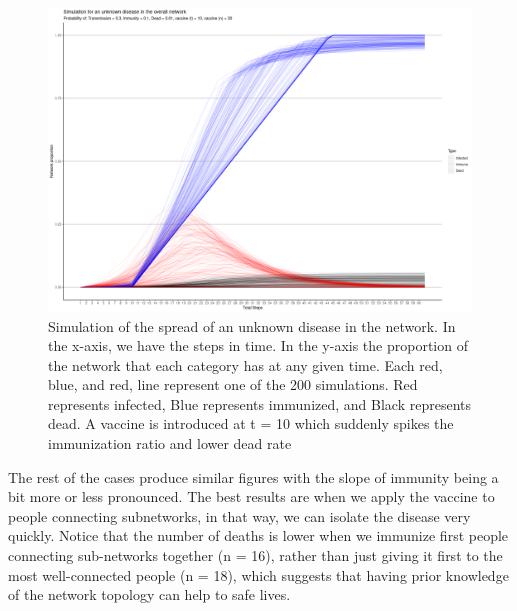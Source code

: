     \begin{figure}[h!]
        \centering
            \includegraphics[width=0.95\linewidth]{figures/Networks/Simulations/Simulation_Vaccine_30.png} 
        \caption{Simulation of the spread of an unknown disease in the network. In the x-axis, we have the steps in time. In the y-axis the proportion of the network that each category has at any given time. Each red, blue, and red, line represent one of the 200 simulations. Red represents infected, Blue represents immunized, and Black represents dead. A vaccine is introduced at t = 10 which suddenly spikes the immunization ratio and lower dead rate}
        \label{figure:simulationsB}
    \end{figure}  

The rest of the cases produce similar figures with the slope of immunity being a bit more or less pronounced. The best results are when we apply the vaccine to people connecting subnetworks, in that way, we can isolate the disease very quickly. Notice that the number of deaths is lower when we immunize first people connecting sub-networks together (n = 16), rather than just giving it first to the most well-connected people (n = 18), which suggests that having prior knowledge of the network topology can help to safe lives.






